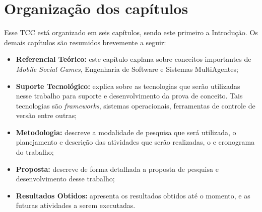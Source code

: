 \section{Organização dos capítulos}

Esse TCC está organizado em seis capítulos, sendo este primeiro a Introdução. Os demais capítulos são resumidos brevemente a seguir:

  \begin{itemize}
    \item \textbf{Referencial Teórico:} este capítulo explana sobre conceitos importantes de \textit{Mobile Social Games}, Engenharia de Software e Sistemas MultiAgentes;
    \item \textbf{Suporte Tecnológico:} explica sobre as tecnologias que serão utilizadas nesse trabalho para suporte e desenvolvimento da prova de conceito. Tais tecnologias são \textit{frameworks}, sistemas operacionais, ferramentas de controle de versão entre outras;
    \item \textbf{Metodologia:} descreve a modalidade de pesquisa que será utilizada, o planejamento e descrição das atividades que serão realizadas, o e cronograma do trabalho;
    \item \textbf{Proposta:} descreve de forma detalhada a proposta de pesquisa e desenvolvimento desse trabalho;
    \item \textbf{Resultados Obtidos:} apresenta os resultados obtidos até o momento, e as futuras atividades a serem executadas.
  \end{itemize}
